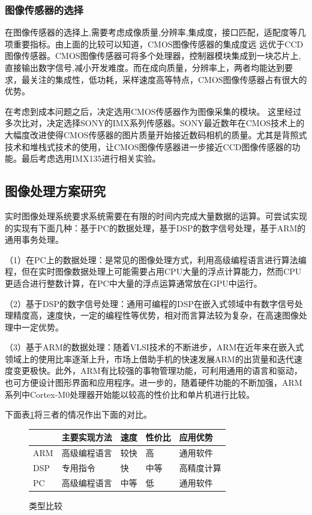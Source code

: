 \subsubsection{图像传感器的选择}
在图像传感器的选择上,需要考虑成像质量,分辨率,集成度，接口匹配，适配度等几项重要指标。由上面的比较可以知道，CMOS图像传感器的集成度远
远优于CCD图像传感器。CMOS图像传感器可将多个处理器，控制器模块集成到一块芯片上,直接输出数字信号,减小开发难度。而在成向质量，分辨率上，两者均能达到要求，最关注的集成性，低功耗，采样速度高等特点，CMOS图像传感器占有很大的优势。

在考虑到成本问题之后，决定选用CMOS传感器作为图像采集的模块。
这里经过多次比对，决定选择SONY的IMX系列传感器。SONY最近数年在CMOS技术上的大幅度改进使得CMOS传感器的图片质量开始接近数码相机的质量。尤其是背照式技术和堆栈式技术的使用，让CMOS图像传感器进一步接近CCD图像传感器的功能。最后考虑选用IMX135进行相关实验。


\subsection{图像处理方案研究}
实时图像处理系统要求系统需要在有限的时间内完成大量数据的运算。可尝试实现的实现有下面几种：基于PC的数据处理，基于DSP的数字信号处理，基于ARM的通用事务处理。

（1）在PC上的数据处理：是常见的图像处理方式，利用高级编程语言进行算法编程，但在实时图像数据处理上可能需要占用CPU大量的浮点计算能力，然而CPU更适合进行整数计算，在PC中大量的浮点运算通常放在GPU中运行。

（2）基于DSP的数字信号处理：通用可编程的DSP在嵌入式领域中有数字信号处理精度高，速度快，一定的编程性等优势，相对而言算法较为复杂，在高速图像处理中一定优势。

（3）基于ARM的数据处理：随着VLSI技术的不断进步，ARM在近年来在嵌入式领域上的使用比率逐渐上升，市场上借助手机的快速发展ARM的出货量和迭代速度变更极快。此外，ARM有比较强的事物管理功能，可利用通用的语言和驱动，也可方便设计图形界面和应用程序。进一步的，随着硬件功能的不断加强，ARM系列中Cortex-M0处理器开始能以较高的性价比和单片机进行比较。


下面表\ref{table:tabarm}将三者的情况作出下面的对比。


\begin{figure}[h]
	\centering
	\caption{类型比较}
	\label{table:tabarm}
\begin{tabular}{lllll}
	\toprule
	\rowcolor{mygray}
	    & 主要实现方法   & 速度 &  性价比 & 应用优势 \\
	\midrule
	ARM     & 高级编程语言  & 较快 & 高  & 通用软件  \\
	\rowcolor{mygray}
	DSP       & 专用指令  & 快 & 中等 & 高精度计算 \\
	PC         & 高级编程语言  & 中等 & 低  & 通用软件 \\
	\bottomrule
\end{tabular}
\end{figure}

